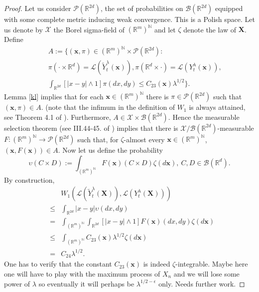 \documentclass[a4paper,draft]{article}
\begin{document}
\begin{proof}
Let us consider $\mathcal{P}(\mathbb{R}^{2d})$, the set of
probabilities on $\mathcal{B}(\mathbb{R}^{2d})$ equipped with some complete
metric inducing weak convergence. This is a Polish space.
Let us denote by $\mathcal{X}$ the Borel sigma-field of $(\mathbb{R}^m)^{\mathbb{N}}$
and let $\zeta$ denote the law of $\mathbf{X}$.
Define
\begin{eqnarray*}
& & A:=\{(\mathbf{x},\pi)\in (\mathbb{R}^m)^{\mathbb{N}}\times\mathcal{P}(\mathbb{R}^{2d}):\\
& & \pi(\cdot\times\mathbb{R}^d)=\mathcal{L}(\tilde{Y}^{\lambda}_t(\mathbf{x})),
\pi(\mathbb{R}^d\times\cdot)=\mathcal{L}(Y^{\lambda}_t(\mathbf{x})),\\
& & \int_{\mathbb{R}^{2d}} [|x-y|\wedge 1]\pi(dx,dy)\leq C_{23}(\mathbf{x})\lambda^{1/2}\}.
\end{eqnarray*}
Lemma \ref{kl} implies that for each $\mathbf{x}\in(\mathbb{R}^{m})^{\mathbb{N}}$
there is $\pi\in\mathcal{P}(\mathbb{R}^{2d})$ such that $(\mathbf{x},\pi)\in A$.
(note that the infimum in the definition of $W_1$ is always attained, see Theorem 4.1 of \cite{villani}).
Furthermore, $A\in\mathcal{X}\times \mathcal{B}(\mathbb{R}^{2d})$.
Hence the measurable selection theorem (see III.44-45. of \cite{dm})
implies that there is $\mathcal{X}/\mathcal{B}(\mathbb{R}^{2d})$-measurable
$F:(\mathbb{R}^m)^{\mathbb{N}}\to \mathcal{P}(\mathbb{R}^{2d})$ such that,
for $\zeta$-almost every $\mathbf{x}\in (\mathbb{R}^m)^{\mathbb{N}}$,
$(\mathbf{x},F(\mathbf{x}))\in A$. Now let us define the probability
$$
\upsilon(C\times D):= \int_{(\mathbb{R}^m)^{\mathbb{N}}}
F(\mathbf{x})(C\times D)\zeta(d\mathbf{x}),\ C,D\in\mathcal{B}(\mathbb{R}^{d}).
$$
By construction,
\begin{eqnarray*}
& & W_1(\mathcal{L}(\tilde{Y}^{\lambda}_t(\mathbf{X})),
\mathcal{L}(Y^{\lambda}_t(\mathbf{X})))\\
&\leq& \int_{\mathbb{R}^{2d}}|x-y|\upsilon(dx,dy)\\
&=& \int_{(\mathbb{R}^m)^{\mathbb{N}}} \int_{\mathbb{R}^{2d}} [|x-y|\wedge 1]F(\mathbf{x})(dx,dy)
\zeta(d\mathbf{x})\\
&\leq &  \int_{(\mathbb{R}^m)^{\mathbb{N}}} C_{23}(\mathbf{x})\lambda^{1/2} \zeta(d\mathbf{x})\\
&=& C_{24}\lambda^{1/2}.
\end{eqnarray*}
One has to verify that the constant $C_{23}(\mathbf{x})$ is indeed $\zeta$-integrable. Maybe here one
will have to play with the maximum process of $X_n$ and we will lose some power of $\lambda$ so
eventually it will perhaps be $\lambda^{1/2-\epsilon}$ only. Needs further work.
\end{proof}
\end{document}
